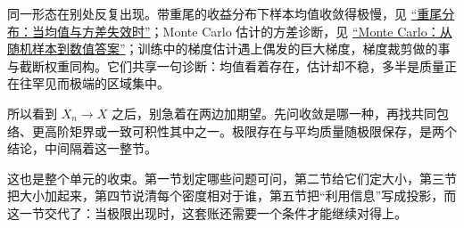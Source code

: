 同一形态在别处反复出现。带重尾的收益分布下样本均值收敛得极慢，见 \hyperref[sec:05-Probability/06-Common-Distributions/07]{``重尾分布：当均值与方差失效时''}；Monte Carlo 估计的方差诊断，见 \hyperref[sec:05-Probability/08-Limit-Theorems/05]{``Monte Carlo：从随机样本到数值答案''}；训练中的梯度估计遇上偶发的巨大梯度，梯度裁剪做的事与截断权重同构。它们共享一句诊断：均值看着存在，估计却不稳，多半是质量正在往罕见而极端的区域集中。

所以看到 \(X_n\to X\) 之后，别急着在两边加期望。先问收敛是哪一种，再找共同包络、更高阶矩界或一致可积性其中之一。极限存在与平均质量随极限保存，是两个结论，中间隔着这一整节。

这也是整个单元的收束。第一节划定哪些问题可问，第二节给它们定大小，第三节把大小加起来，第四节说清每个密度相对于谁，第五节把``利用信息''写成投影，而这一节交代了：当极限出现时，这套账还需要一个条件才能继续对得上。
